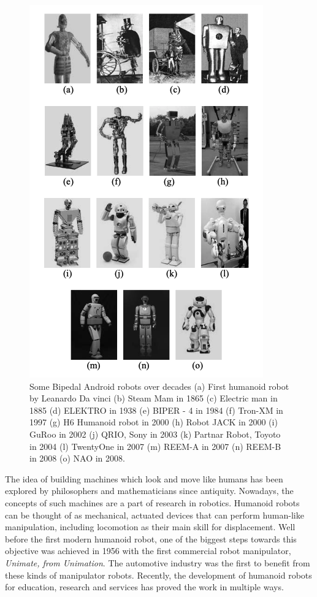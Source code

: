 \begin{figure}[h!]
    \centering
    \includegraphics[scale=1.0]{images/intro-3.png}\hfill
    \caption[Humanoid robots over decades]{Some Bipedal Android robots over decades \cite{evolution} 
        (a) First humanoid robot by Leanardo Da vinci (b) Steam Mam in 1865 (c) Electric man in 1885 (d) 
        ELEKTRO in 1938 (e) BIPER - 4 in 1984 (f) Tron-XM in 1997 (g) H6 Humanoid robot in 2000 (h) Robot 
        JACK in 2000 (i)  GuRoo in 2002 (j) QRIO, Sony in 2003 (k) Partnar Robot, Toyoto in 2004 (l) TwentyOne
        in 2007 (m) REEM-A in 2007 (n) REEM-B in 2008 (o) NAO in 2008.}\hfill
    \label{humanoid-robots}
\end{figure}

The idea of building machines which look and move like humans has been explored by philosophers and mathematicians
since antiquity. Nowadays, the concepts of such machines are a part of research in robotics. Humanoid robots can 
be thought of as mechanical, actuated devices that can perform human-like manipulation, including locomotion as 
their main skill for displacement. Well before the first modern humanoid robot, one of the biggest steps towards 
this objective was achieved in 1956 with the first commercial robot manipulator, \textit{Unimate, from Unimation}. 
The automotive industry was the first to benefit from these kinds of manipulator robots. Recently, the development 
of humanoid robots for education, research and services has proved the work in multiple ways. 


